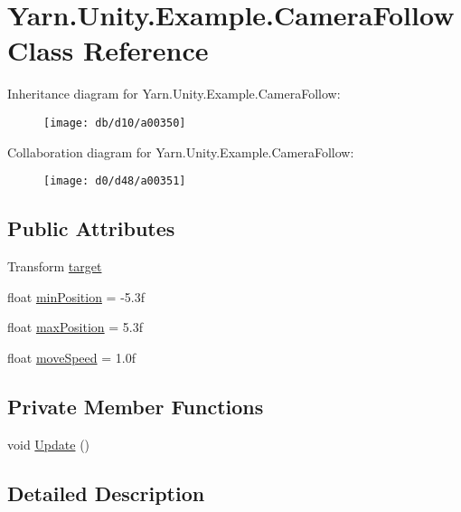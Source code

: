 \hypertarget{a00023}{\section{Yarn.\-Unity.\-Example.\-Camera\-Follow Class Reference}
\label{a00023}
}


Inheritance diagram for Yarn.\-Unity.\-Example.\-Camera\-Follow\-:
\nopagebreak
\begin{figure}[H]
\begin{center}
\leavevmode
\texttt{[image: db/d10/a00350]}
\end{center}
\end{figure}


Collaboration diagram for Yarn.\-Unity.\-Example.\-Camera\-Follow\-:
\nopagebreak
\begin{figure}[H]
\begin{center}
\leavevmode
\texttt{[image: d0/d48/a00351]}
\end{center}
\end{figure}
\subsection*{Public Attributes}
\begin{DoxyCompactItemize}
\item 
Transform \hyperlink{a00023_aa5d6958fb14a14ebb74e21c372fcca8b}{target}
\item 
float \hyperlink{a00023_a08c6f6c0ea423c21af99e4b5467d3c9b}{min\-Position} = -\/5.\-3f
\item 
float \hyperlink{a00023_abb0154dcbc2a7d43795beacd61a56de4}{max\-Position} = 5.\-3f
\item 
float \hyperlink{a00023_a3d4f2efe9c2cee8c7ff797cac03f27ec}{move\-Speed} = 1.\-0f
\end{DoxyCompactItemize}
\subsection*{Private Member Functions}
\begin{DoxyCompactItemize}
\item 
void \hyperlink{a00023_a592ddbf8e493bde0a6536c0234869217}{Update} ()
\end{DoxyCompactItemize}


\subsection{Detailed Description}


